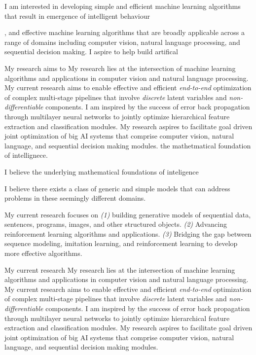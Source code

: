 \documentclass[a4paper, 10pt]{article}
\begin{document}
I am interested in developing simple and efficient machine learning
algorithms that result in emergence of intelligent behaviour 


, and effective machine learning
algorithms that are broadly applicable across a range of domains
including computer vision, natural language processing, and sequential
decision making. I aspire to help build artifical


My research aims to My research lies at the intersection of machine learning algorithms
and applications in computer vision and natural language processing.
My current research aims to enable effective and efficient {\em                                                                                            
  end-to-end} optimization of complex multi-stage pipelines that
involve {\em discrete} latent variables and {\em non-differentiable}
components.  I am inspired by the success of error back propagation
through multilayer neural networks to jointly optimize hierarchical
feature extraction and classification modules. My research aspires
to facilitate goal driven joint optimization of big AI systems that
comprise computer vision, natural language, and sequential decision
making modules. the mathetmatical foundation of intellignece.



I believe the underlying mathematical
foundations of inteligence  


 I believe there exists a class of generic and
simple models that can address problems in these seemingly different
domains.


My
current research focuses on {\em (1)} building generative models of
sequential data, sentences, programs, images, and other structured
objects.  {\em (2)} Advancing reinforcement learning algorithms and
applications. {\em (3)} Bridging the gap between sequence modeling,
imitation learning, and reinforcement learning to develop more
effective algorithms.


My current
research My research lies at the intersection of machine learning algorithms
and applications in computer vision and natural language processing.
My current research aims to enable effective and efficient {\em                                                                                            
  end-to-end} optimization of complex multi-stage pipelines that
involve {\em discrete} latent variables and {\em non-differentiable}
components.  I am inspired by the success of error back propagation
through multilayer neural networks to jointly optimize hierarchical
feature extraction and classification modules. My research aspires
to facilitate goal driven joint optimization of big AI systems that
comprise computer vision, natural language, and sequential decision
making modules.
\end{document}
